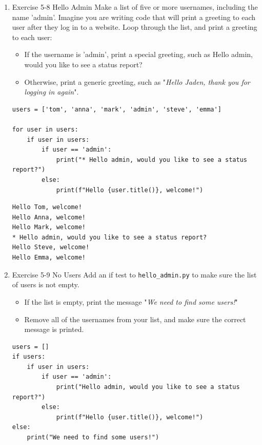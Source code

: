 \documentclass[10pt]{book}
\begin{document}
\begin{enumerate}
\item Exercise 5-8 Hello Admin
\label{sec:org5f3765d}
Make a list of five or more usernames, including the name 'admin'. Imagine you are writing code that will print a greeting to each user after they log in to a website. Loop through the list, and print a greeting to each user:
\begin{itemize}
\item If the username is 'admin', print a special greeting, such as Hello admin, would you like to see a status report?
\item Otherwise, print a generic greeting, such as "\emph{Hello Jaden, thank you for logging in again}".
\end{itemize}
\begin{verbatim}
users = ['tom', 'anna', 'mark', 'admin', 'steve', 'emma']

for user in users:
    if user in users:
        if user == 'admin':
            print("* Hello admin, would you like to see a status report?")
        else:
            print(f"Hello {user.title()}, welcome!")
\end{verbatim}

\label{org46c7c69}
\begin{verbatim}
Hello Tom, welcome!
Hello Anna, welcome!
Hello Mark, welcome!
* Hello admin, would you like to see a status report?
Hello Steve, welcome!
Hello Emma, welcome!
\end{verbatim}
\item Exercise 5-9 No Users
\label{sec:orgfdfccb8}
Add an if test to \texttt{hello\_admin.py} to make sure the list of users is not empty.
\begin{itemize}
\item If the list is empty, print the message "\emph{We need to find some users!}"
\item Remove all of the usernames from your list, and make sure the correct message is printed.
\end{itemize}
\begin{verbatim}
users = []
if users:
    if user in users:
        if user == 'admin':
            print("Hello admin, would you like to see a status report?")
        else:
            print(f"Hello {user.title()}, welcome!")
else:
    print("We need to find some users!")
\end{verbatim}


\end{enumerate}
\end{document}
